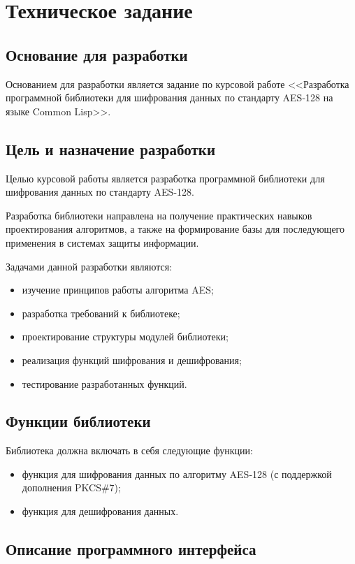 \section{Техническое задание}
\subsection{Основание для разработки}

Основанием для разработки является задание по курсовой работе 
<<Разработка программной библиотеки для шифрования данных по стандарту AES-128 на языке Common Lisp>>. 

\subsection{Цель и назначение разработки}

Целью курсовой работы является разработка программной библиотеки для шифрования данных по стандарту AES-128.  

Разработка библиотеки направлена на получение практических навыков проектирования алгоритмов, а также на формирование базы для последующего применения в системах защиты информации.  

Задачами данной разработки являются:
\begin{itemize}
	\item изучение принципов работы алгоритма AES;
	\item разработка требований к библиотеке;
	\item проектирование структуры модулей библиотеки; 
	\item реализация функций шифрования и дешифрования;
	\item тестирование разработанных функций.
\end{itemize}

\subsection{Функции библиотеки}

Библиотека должна включать в себя следующие функции:
\begin{itemize}
	\item функция для шифрования данных по алгоритму AES-128 (с поддержкой дополнения PKCS\#7);
	\item функция для дешифрования данных.
\end{itemize}

\subsection{Описание программного интерфейса}


